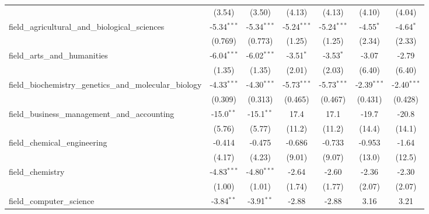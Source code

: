\begin{tabular}{lcccccc}
                                                               & (3.54)        & (3.50)        & (4.13)        & (4.13)         & (4.10)        & (4.04)\\   
   field\_agricultural\_and\_biological\_sciences              & -5.34$^{***}$ & -5.34$^{***}$ & -5.24$^{***}$ & -5.24$^{***}$  & -4.55$^{*}$   & -4.64$^{*}$\\   
                                                               & (0.769)       & (0.773)       & (1.25)        & (1.25)         & (2.34)        & (2.33)\\   
   field\_arts\_and\_humanities                                & -6.04$^{***}$ & -6.02$^{***}$ & -3.51$^{*}$   & -3.53$^{*}$    & -3.07         & -2.79\\   
                                                               & (1.35)        & (1.35)        & (2.01)        & (2.03)         & (6.40)        & (6.40)\\   
   field\_biochemistry\_genetics\_and\_molecular\_biology      & -4.33$^{***}$ & -4.30$^{***}$ & -5.73$^{***}$ & -5.73$^{***}$  & -2.39$^{***}$ & -2.40$^{***}$\\   
                                                               & (0.309)       & (0.313)       & (0.465)       & (0.467)        & (0.431)       & (0.428)\\   
   field\_business\_management\_and\_accounting                & -15.0$^{**}$  & -15.1$^{**}$  & 17.4          & 17.1           & -19.7         & -20.8\\   
                                                               & (5.76)        & (5.77)        & (11.2)        & (11.2)         & (14.4)        & (14.1)\\   
   field\_chemical\_engineering                                & -0.414        & -0.475        & -0.686        & -0.733         & -0.953        & -1.64\\   
                                                               & (4.17)        & (4.23)        & (9.01)        & (9.07)         & (13.0)        & (12.5)\\   
   field\_chemistry                                            & -4.83$^{***}$ & -4.80$^{***}$ & -2.64         & -2.60          & -2.36         & -2.30\\   
                                                               & (1.00)        & (1.01)        & (1.74)        & (1.77)         & (2.07)        & (2.07)\\   
   field\_computer\_science                                    & -3.84$^{**}$  & -3.91$^{**}$  & -2.88         & -2.88          & 3.16          & 3.21\\   

\end{tabular}
